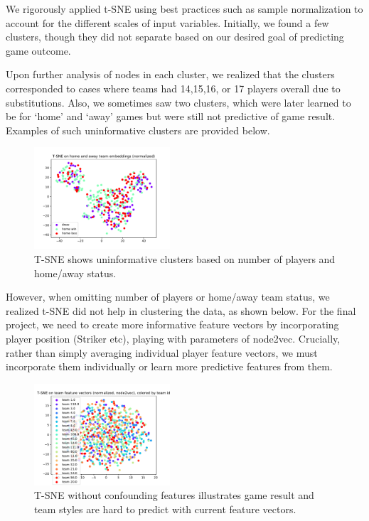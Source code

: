 We rigorously applied t-SNE using best practices such as sample normalization to account for the different scales of input variables. Initially, we found a few clusters, though they did not separate based on our desired goal of predicting game outcome.


Upon further analysis of nodes in each cluster, we realized that the clusters corresponded to cases where teams had 14,15,16, or 17 players overall due to substitutions. Also, we sometimes saw two clusters, which were later learned to be for `home' and `away' games but were still not predictive of game result. Examples of such uninformative clusters are provided below. 

\begin{figure}[h]
  \centering
  \includegraphics[width=0.45\textwidth]{plots/game_NORM_tsne.pdf}
  \caption{T-SNE shows uninformative clusters based on number of players and home/away status.}
\end{figure}


However, when omitting number of players or home/away team status, we realized t-SNE did not help in clustering the data, as shown below. For the final project, we need to create more informative feature vectors by incorporating player position (Striker etc), playing with parameters of node2vec. Crucially, rather than simply averaging individual player feature vectors, we must incorporate them individually or learn more predictive features from them. 

\begin{figure}[h]
  \centering
  \includegraphics[width=0.45\textwidth]{plots/node2vec_NORM_game_team_teamId_tsne.pdf}
  \caption{T-SNE without confounding features illustrates game result and team styles are hard to predict with current feature vectors.}
\end{figure}


